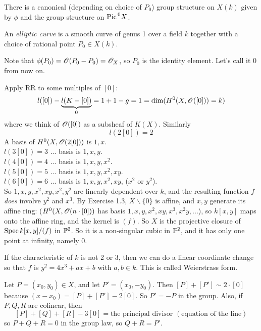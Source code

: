  \begin{corollary}
 There is a canonical (depending on choice of $P_0$) group
 structure on $X(k)$ given by $\phi$ and the group structure on
 $\pic^0 X$.
 \end{corollary}

 \begin{definition}
 An \emph{elliptic curve} is a smooth curve of genus 1 over a
 field $k$ together with a choice of rational point $P_0\in X(k)$.
 \end{definition}

 Note that $\phi(P_0)=\O(P_0-P_0)=\O_X$, so $P_0$ is the identity
 element.  Let's call it 0 from now on.

 Apply RR to some multiples of $[0]$:
 \[
    l([0])-\underbrace{l(K-[0])}_0 = 1+1-g =1 = \dim
    (H^0(X,\O([0]))=k)
 \]
 where we think of $\O([0])$ as a subsheaf of $K(X)$. Similarly
 \[
    l(2[0])=2
 \]
 A basis of $H^0(X,\O(2[0]))$ is $1,x$.\\
 $l(3[0])=3$ ... basis is $1,x,y$.\\
 $l(4[0])=4$ ... basis is $1,x,y,x^2$.\\
 $l(5[0])=5$ ... basis is $1,x,y,x^2,xy$.\\
 $l(6[0])=6$ ... basis is $1,x,y,x^2,xy$, ($x^2$ or $y^2$).\\

 So $1,x,y,x^2,xy,x^2,y^2$ are linearly dependent over $k$, and the
 resulting function $f$ \emph{does} involve $y^2$ and $x^3$.  By
 Exercise 1.3, $X\smallsetminus\{0\}$ is affine, and $x,y$ generate
 its affine ring: ($H^0(X,\O(n\cdot[0]))$ has basis
 $1,x,y,x^2,xy,x^3,x^2y, ...$), so $k[x,y]$ maps onto the affine
 ring, and the kernel is $(f)$.  So $X$ is the projective closure
 of $\spec k[x,y]/(f)$ in $\P^2$.  So it is a non-singular cubic in
 $\P^2$, and it has only one point at infinity, namely 0.

 If the characteristic of $k$ is not 2 or 3, then we can do a
 linear coordinate change so that $f$ is $y^2=4x^3+ax+b$ with
 $a,b\in k$.  This is called Weierstrass form.

 Let $P=(x_0,y_0)\in X$, and let $P'=(x_0,-y_0)$.  Then
 $[P]+[P']\sim 2\cdot[0]$ because $(x-x_0) = [P]+[P']-2[0]$.  So
 $P'=-P$ in the group.  Also, if $P,Q,R$ are colinear, then
 \[
    [P]+[Q]+[R]-3[0] = \text{the principal divisor } (\text{equation of the line})
 \]
 so $P+Q+R=0$ in the group law, so $Q+R=P'$.


